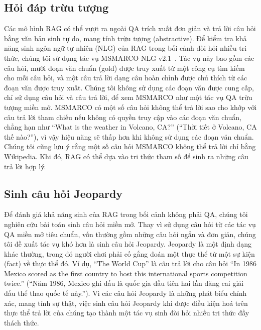 \documentclass[10pt,letterpaper]{article}
\begin{document}
\subsection{Hỏi đáp trừu tượng}

Các mô hình RAG có thể vượt ra ngoài QA trích xuất đơn giản và trả lời câu hỏi
bằng văn bản sinh tự do, mang tính trừu tượng (abstractive). Để kiểm tra khả
năng sinh ngôn ngữ tự nhiên (NLG) của RAG trong bối cảnh đòi hỏi nhiều tri
thức, chúng tôi sử dụng tác vụ MSMARCO NLG v2.1~\cite{b43}. Tác vụ này bao gồm
các câu hỏi, mười đoạn văn chuẩn (gold) được truy xuất từ một công cụ tìm kiếm
cho mỗi câu hỏi, và một câu trả lời dạng câu hoàn chỉnh được chú thích từ các
đoạn văn được truy xuất. Chúng tôi không sử dụng các đoạn văn được cung cấp,
chỉ sử dụng câu hỏi và câu trả lời, để xem MSMARCO như một tác vụ QA trừu tượng
miền mở. MSMARCO có một số câu hỏi không thể trả lời sao cho khớp với câu trả
lời tham chiếu nếu không có quyền truy cập vào các đoạn văn chuẩn, chẳng hạn như
``What is the weather in Volcano, CA?'' (``Thời tiết ở Volcano, CA thế
nào?''), vì vậy hiệu năng sẽ thấp hơn khi không sử dụng các đoạn văn chuẩn.
Chúng tôi cũng lưu ý rằng một số câu hỏi MSMARCO không thể trả lời chỉ bằng
Wikipedia. Khi đó, RAG có thể dựa vào tri thức tham số để sinh ra những câu trả
lời hợp lý.

\subsection{Sinh câu hỏi Jeopardy}

Để đánh giá khả năng sinh của RAG trong bối cảnh không phải QA, chúng tôi
nghiên cứu bài toán sinh câu hỏi miền mở. Thay vì sử dụng câu hỏi từ các tác vụ
QA miền mở tiêu chuẩn, vốn thường gồm những câu hỏi ngắn và đơn giản, chúng tôi
đề xuất tác vụ khó hơn là sinh câu hỏi Jeopardy. Jeopardy là một định dạng khác
thường, trong đó người chơi phải cố gắng đoán một thực thể từ một sự kiện
(fact) về thực thể đó. Ví dụ, ``The World Cup'' là câu trả lời cho câu hỏi
``In 1986 Mexico scored as the first country to host this international sports
competition twice.'' (``Năm 1986, Mexico ghi dấu là quốc gia đầu tiên hai lần
đăng cai giải đấu thể thao quốc tế này.''). Vì các câu hỏi Jeopardy là những
phát biểu chính xác, mang tính sự thật, việc sinh câu hỏi Jeopardy khi được
điều kiện hoá trên thực thể trả lời của chúng tạo thành một tác vụ sinh đòi hỏi
nhiều tri thức đầy thách thức.
\end{document}
